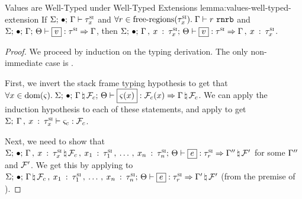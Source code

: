\begin{oxlemma}{Values are Well-Typed under Well-Typed Extensions}
  {lemma:values-well-typed-extension} If
  $\Sigma; \, \bullet; \, \Gamma \vdash \tau^\textsc{si}_x$ and
  $\forall r \in \textrm{free-regions}(\tau^\textsc{si}_x). \;
  \Gamma \vdash r \ \mathtt{rnrb}$ and
  $\oxtypjudge{\oxglobalctx}{\oxemptyctx}{\oxkontctx}{\oxvarctx}
  {\oxvalue}{\oxsitype}{\oxvarctx}$, then
  $\oxtypjudge{\oxglobalctx}{\oxemptyctx}{\oxkontctx}{ \oxextendctx{\oxvarctx}{
      \oxvarctxentry{\oxid}{\oxsitype_\oxid} } }{\oxvalue}{\oxsitype}{
    \oxextendctx{\oxvarctx}{ \oxvarctxentry{\oxid}{\oxsitype_\oxid} } }$.
\end{oxlemma}

\begin{proof}
  We proceed by induction on the typing derivation. The only non-immediate case
  is .

  \vspace{1em}
  \noindent \framebox[\textwidth]{ \figuresize
    \begin{mathpar}
      \TClosureVal
    \end{mathpar}
  } \vspace{1em}

  First, we invert the stack frame typing hypothesis to get that $\forall \oxid
  \in \oxdomain{\oxstackframe}.\;
  \oxtypjudge{\oxglobalctx}{\oxemptyctx}{\oxkontctx}{\oxnewframe{\oxvarctx}{\oxframe_c}}{\oxstackframe(\oxid)}{\oxframe_c(\oxid)}{\oxnewframe{\oxvarctx}{\oxframe_c}}$.
  We can apply the induction hypothesis to each of these statements, and apply
   to get
  $\Sigma; \: \Gamma \, , \: x \: : \: \tau^\textsc{si}_x \vdash \varsigma_c : \mathcal{F}_c$.

  Next, we need to show that
  $\oxtypjudge{\oxglobalctx}{\oxemptyctx}{\oxkontctx}{ \oxnewframe{
      \oxextendctx{\oxvarctx}{ \oxvarctxentry{\oxid}{\oxsitype_\oxid} } }{
      \oxframe_c \oxcomma \oxvarctxentry{\oxid_1}{\oxsitype_1} \oxdotsc
      \oxvarctxentry{\oxid_n}{\oxsitype_n} }
  }{\oxexpr}{\oxsitype_\oxcprov}{\oxnewframe{\oxvarctx^{\prime\prime}}{\oxframe^\prime}}$
  for some $\Gamma^{\prime\prime}$ and $\mathcal{F}^\prime$. We get this by
  applying  to
  $\oxtypjudge{\oxglobalctx}{\oxemptyctx}{\oxkontctx}{ \oxnewframe{\oxvarctx}{
      \oxframe_c \oxcomma \oxvarctxentry{\oxid_1}{\oxsitype_1} \oxdotsc
      \oxvarctxentry{\oxid_n}{\oxsitype_n} }
  }{\oxexpr}{\oxsitype_\oxcprov}{\oxnewframe{\oxvarctx^\prime}{\oxframe^\prime}}$
  (from the premise of ).
\end{proof}

